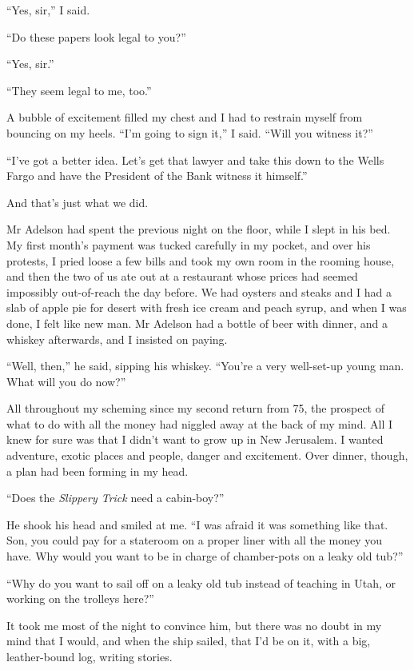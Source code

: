 ``Yes, sir,'' I said.

``Do these papers look legal to you?''

``Yes, sir.''

``They seem legal to me, too.''

A bubble of excitement filled my chest and I had to restrain myself
from bouncing on my heels. ``I'm going to sign it,'' I said.
``Will you witness it?''

``I've got a better idea. Let's get that lawyer and take this down to the Wells 
Fargo and have the President of the Bank witness it himself.''

And that's just what we did.

\tb

Mr Adelson had spent the previous night on the floor, while I slept
in his bed. My first month's payment was tucked carefully in my
pocket, and over his protests, I pried loose a few bills and took
my own room in the rooming house, and then the two of us ate out at
a restaurant whose prices had seemed impossibly out-of-reach the
day before. We had oysters and steaks and I had a slab of apple pie
for desert with fresh ice cream and peach syrup, and when I was
done, I felt like new man. Mr Adelson had a bottle of beer with
dinner, and a whiskey afterwards, and I insisted on paying.

``Well, then,'' he said, sipping his whiskey.
``You're a very well-set-up young man. What will you do now?''

All throughout my scheming since my second return from 75, the
prospect of what to do with all the money had niggled away at the
back of my mind. All I knew for sure was that I didn't want to grow
up in New Jerusalem. I wanted adventure, exotic places and people,
danger and excitement. Over dinner, though, a plan had been forming
in my head.

``Does the \emph{Slippery Trick} need a cabin-boy?''

He shook his head and smiled at me.
``I was afraid it was something like that. Son, you could pay for a stateroom 
on a proper liner with all the money you have. Why would you want to be in 
charge of chamber-pots on a leaky old tub?''

``Why do you want to sail off on a leaky old tub instead of teaching in Utah, 
or working on the trolleys here?''

It took me most of the night to convince him, but there was no
doubt in my mind that I would, and when the ship sailed, that I'd
be on it, with a big, leather-bound log, writing stories.


